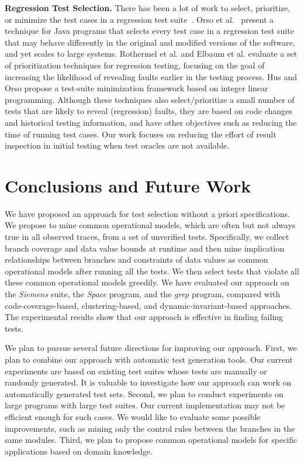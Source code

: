 \documentclass{sig-alternate}
\begin{document}
\textbf{Regression Test Selection.} There has been a lot of work to
select, prioritize, or minimize the test cases in a regression test
suite~\cite{Elbaum02,Hsu09,Orso04,Rothermel01}. Orso et
al.~\cite{Orso04} present a technique for Java programs that selects
every test case in a regression test suite that may behave
differently in the original and modified versions of the software,
and yet scales to large systems. Rothermel et al. \cite{Rothermel01}
and Elbaum et al. \cite{Elbaum02} evaluate a set of prioritization
techniques for regression testing, focusing on the goal of
increasing the likelihood of revealing faults earlier in the testing
process. Hus and Orso \cite{Hsu09} propose a test-suite minimization
framework based on integer linear programming. Although these
techniques also select/prioritize a small number of tests that are
likely to reveal (regression) faults, they are based on code changes
and historical testing information, and have other objectives such
as reducing the time of running test cases. Our work focuses on
reducing the effort of result inspection in initial testing when
test oracles are not available.




\vspace{-0.15in}

\section{Conclusions and Future Work}
\label{sec:conclusions}

We have proposed an approach for test selection without a priori
specifications. We propose to mine common operational models, which
are often but not always true in all observed traces, from a set of
unverified tests. Specifically, we collect branch coverage and data
value bounds at runtime and then mine implication relationships
between branches and constraints of data values as common
operational models after running all the tests. We then select tests
that violate all these common operational models greedily. We have
evaluated our approach on the {\it Siemens} suite, the {\it Space}
program, and the {\it grep} program, compared with
code-coverage-based, clustering-based, and dynamic-invariant-based
approaches. The experimental results show that our approach is
effective in finding failing tests.

We plan to pursue several future directions for improving our
approach. First, we plan to combine our approach with automatic test
generation tools. Our current experiments are based on existing test
suites whose tests are manually or randomly generated. It is
valuable to investigate how our approach can work on automatically
generated test sets. Second, we plan to conduct experiments on large
programs with large test suites. Our current implementation may not
be efficient enough for such cases. We would like to evaluate some
possible improvements, such as mining only the control rules between
the branches in the same modules. Third, we plan to propose common
operational models for specific applications based on domain
knowledge.







\end{document}
